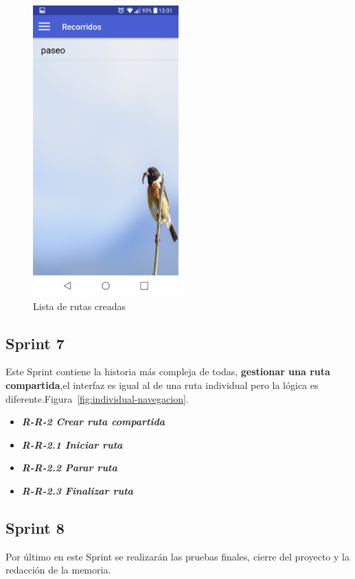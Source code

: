 \begin{figure}[htbp]
		\centering
		\includegraphics[width=0.5\textwidth] {capturamovil/listarutas}
		\caption{Lista de rutas creadas}
		 \label{fig:listarutas}
	\end{figure}
\newpage
\subsection{Sprint 7}
Este Sprint contiene la historia más compleja de todas,\textbf{ gestionar una ruta compartida},el interfaz es igual al de una ruta individual pero la lógica es diferente.Figura~\ref{fig:individual-navegacion}.

\begin{itemize}
\item \textbf{\textit{R-R-2 Crear ruta compartida}}
\item \textbf{\textit{R-R-2.1 Iniciar ruta}}
\item \textbf{\textit{R-R-2.2 Parar ruta}}
\item \textbf{\textit{R-R-2.3 Finalizar ruta}}
\end{itemize}










\subsection{Sprint 8}

Por último en este Sprint se realizarán las pruebas finales, cierre del proyecto y la redacción de la memoria.

